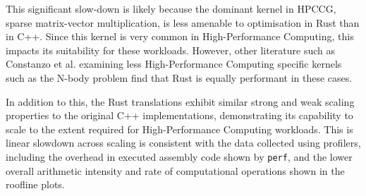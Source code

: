 This significant slow-down is likely because the dominant kernel in HPCCG, sparse matrix-vector multiplication, is less amenable to optimisation in Rust than in C++. Since this kernel is very common in High-Performance Computing, this impacts its suitability for these workloads. However, other literature such as Constanzo et al. \cite{costanzoPerformanceVsProgramming2021} examining less High-Performance Computing specific kernels such as the N-body problem find that Rust is equally performant in these cases.

In addition to this, the Rust translations exhibit similar strong and weak scaling properties to the original C++ implementations, demonstrating its capability to scale to the extent required for High-Performance Computing workloads. This is linear slowdown across scaling is consistent with the data collected using profilers, including the overhead in executed assembly code shown by \texttt{perf}, and the lower overall arithmetic intensity and rate of computational operations shown in the roofline plots.